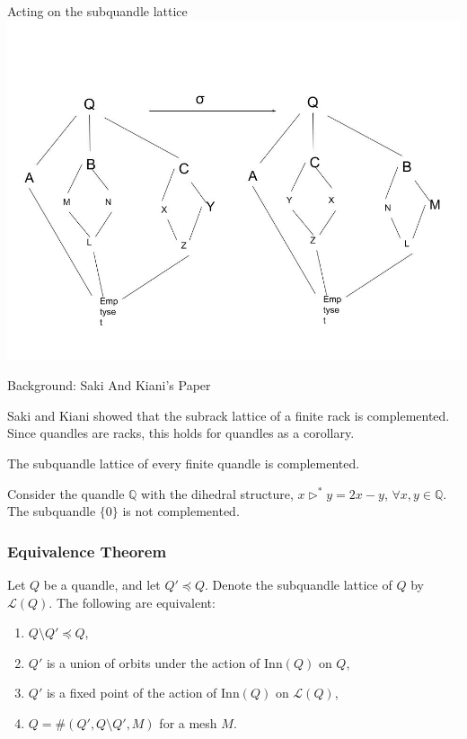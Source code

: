 \documentclass[10pt]{beamer}
\newcommand{\Q}{\mathbb{Q}}
\newcommand{\sq}{\preccurlyeq} %
\newcommand{\thru}{\rhd} %
\newcommand{\Inn}{\mathrm{Inn}} %
\theoremstyle{plain}
\begin{document}
        \begin{frame}{Acting on the subquandle lattice}
        \includegraphics[scale = 0.35]{figures/lattice_transformation.jpg}
    \end{frame}


    \begin{frame}{Background: Saki And Kiani's Paper}

        Saki and Kiani showed that the subrack lattice of a finite rack is complemented. Since quandles are racks, this holds for quandles as a corollary.
        
        \begin{corollary}
        The subquandle lattice of every finite quandle is complemented.
        \end{corollary}
        \vspace{0.2in}
        \pause
        
        \begin{theorem}
        Consider the quandle $\Q$ with the dihedral structure, $x\thru^* y = 2x-y$, $\forall x,y\in \Q$. The subquandle $\{0\}$ is not complemented.
        \end{theorem}
    \end{frame}

    
    \begin{frame}
        \frametitle{Equivalence Theorem}
        \begin{theorem}
            \label{equivalenceTheorem}
            Let $Q$ be a quandle, and let $Q'\sq Q$. Denote the subquandle lattice of $Q$ by $\mathcal{L}(Q)$. The following are equivalent:
            \begin{enumerate}
                \item $Q\setminus Q'\sq Q$,
                \item $Q'$ is a union of orbits under the action of $\Inn(Q)$ on $Q$,
                \item $Q'$ is a fixed point of the action of $\Inn(Q)$ on $\mathcal{L}(Q)$,
                \item $Q = \#(Q',Q\setminus Q', M)$ for a mesh $M$.
            \end{enumerate}
        \end{theorem}
    \end{frame}
\end{document}

